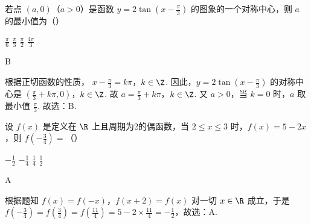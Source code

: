 \begin{problem}
若点 \((a,0)\)（\(a>0\)）是函数 \(y=2\tan\left(x-\frac{\pi}{3}\right)\) 的图象的一个对称中心，则 \(a\) 的最小值为（\quad）

\choices
    {\(\frac{\pi}{6}\)}
    {\(\frac{\pi}{3}\)}
    {\(\frac{\pi}{2}\)}
    {\(\frac{4\pi}{3}\)}
\end{problem}

\begin{answer}
B
\end{answer}

\begin{solution}
根据正切函数的性质，
\(x-\frac{\pi}{3}=k\pi\)，\(k \in \Z\).
因此，\(y=2\tan\left(x-\frac{\pi}{3}\right)\) 的对称中心是 \(\left(\frac{\pi}{3}+k\pi,0\right)\)，\(k \in \Z\). 故 \(a=\frac{\pi}{3}+k\pi\)，\(k \in \Z\).
又 \(a>0\)，当 \(k=0\) 时，\(a\) 取最小值 \(\frac{\pi}{3}\). 故选：B.
\end{solution}

\begin{problem}
设 \(f(x)\) 是定义在 \(\R\) 上且周期为2的偶函数，当 \(2 \le x \le 3\) 时，\(f(x)=5-2x\)，则 \(f\left(-\frac{3}{4}\right)=\)（\quad）

\choices
    {\(-\frac{1}{2}\)}
    {\(-\frac{1}{4}\)}
    {\(\frac{1}{4}\)}
    {\(\frac{1}{2}\)}
\end{problem}

\begin{answer}
A
\end{answer}

\begin{solution}
根据题知 \(f(x)=f(-x)\)，\(f(x+2)=f(x)\) 对一切 \(x \in \R\) 成立，于是
\(f\left(-\frac{3}{4}\right)=f\left(\frac{3}{4}\right)=f\left(\frac{11}{4}\right)=5-2 \times \frac{11}{4}=-\frac{1}{2}\)，故选：A.
\end{solution}

